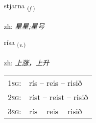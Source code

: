 \documentclass[frontgrid, backgrid]{flacards}\usepackage[]{graphicx}\usepackage[]{color}
\begin{document}
\renewcommand{\flhead}{\vskip5pt \fboxsep=0pt {\small\bfseries\footnotesize Nafnorð | 名词}}
\renewcommand{\fcfoot}{\vskip5pt \fboxsep=0pt \hspace{2pt}{\small\bfseries\footnotesize 2K}}

\renewcommand{\blhead}{\vskip5pt {\small\bfseries\footnotesize Nafnorð | 名词 }}
\renewcommand{\bcfoot}{\vskip5pt \hspace{2pt}{\small\bfseries\footnotesize 2K}}


{stjarna \small{\textsubscript{(\textit{f.})}} \\[1ex] %
\textphonetic{[stjartna]} \\
zh: \emph{星星;星号} \\  [2ex]
\renewcommand*{\arraystretch}{0.8}
}

\renewcommand{\flhead}{\vskip5pt \fboxsep=0pt {\small\bfseries\footnotesize Sagnorð | 动词}}
\renewcommand{\fcfoot}{\vskip5pt \fboxsep=0pt \hspace{2pt}{\small\bfseries\footnotesize 2K}}

\renewcommand{\blhead}{\vskip5pt {\small\bfseries\footnotesize Sagnorð | 动词 }}
\renewcommand{\bcfoot}{\vskip5pt \hspace{2pt}{\small\bfseries\footnotesize 2K}}


{rísa \small{\textsubscript{(\textit{v.})}} \\[1ex] %
\textphonetic{[riːsa]} \\
zh: \emph{上涨，上升} \\  [2ex]
\renewcommand*{\arraystretch}{0.8}
\begin{tabular}{p{1cm}l}
\textsc{1sg}: & rís -- reis -- risið \\ 
\textsc{2sg}: & ríst -- reist -- risið \\ 
\textsc{3sg}: & rís -- reis -- risið \\ 
\end{tabular}
}
\end{document}
